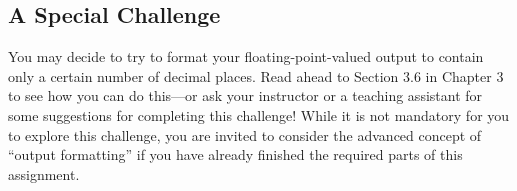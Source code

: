 \vspace{-0.1in}
\subsection*{A Special Challenge}

You may decide to try to format your floating-point-valued output to contain only a certain number of decimal places.
Read ahead to Section 3.6 in Chapter 3 to see how you can do this---or ask your instructor or a teaching assistant for
some suggestions for completing this challenge! While it is not mandatory for you to explore this challenge, you are
invited to consider the advanced concept of ``output formatting'' if you have already finished the required parts of
this assignment.


